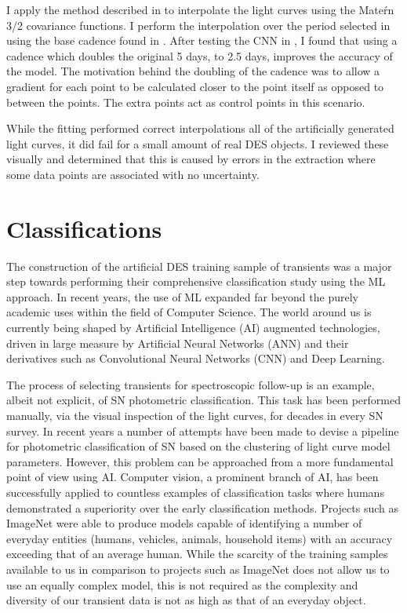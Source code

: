 I apply the method described in  to interpolate the light curves using the Mate\'rn 3/2 covariance functions. I perform the interpolation over the period selected in  using the base cadence found in . After testing the CNN in , I found that using a cadence which doubles the original 5 days, to 2.5 days, improves the accuracy of the model. The motivation behind the doubling of the cadence was to allow a gradient for each point to be calculated closer to the point itself as opposed to between the points. The extra points act as control points in this scenario.

While the fitting performed correct interpolations all of the artificially generated light curves, it did fail for a small amount of real DES objects. I reviewed these visually and determined that this is caused by errors in the extraction where some data points are associated with no uncertainty.

\section{Classifications} \label{sec:CNN}
The construction of the artificial DES training sample of transients was a major step towards performing their comprehensive classification study using the ML approach. In recent years, the use of ML expanded far beyond the purely academic uses within the field of Computer Science. The world around us is currently being shaped by Artificial Intelligence (AI) augmented technologies, driven in large measure by Artificial Neural Networks (ANN) and their derivatives such as Convolutional Neural Networks (CNN) and Deep Learning.

The process of selecting transients for spectroscopic follow-up is an example, albeit not explicit, of SN photometric classification. This task has been performed manually, via the visual inspection of the light curves, for decades in every SN survey. In recent years a number of attempts have been made to devise a pipeline for photometric classification of SN based on the clustering of light curve model parameters. However, this problem can be approached from a more fundamental point of view using AI. Computer vision, a prominent branch of AI, has been successfully applied to countless examples of classification tasks where humans demonstrated a superiority over the early classification methods. Projects such as ImageNet \citep{Russakovsky2014} were able to produce models capable of identifying a number of everyday entities (humans, vehicles, animals, household items) with an accuracy exceeding that of an average human. While the scarcity of the training samples available to us in comparison to projects such as ImageNet does not allow us to use an equally complex model, this is not required as the complexity and diversity of our transient data is not as high as that of an everyday object.


